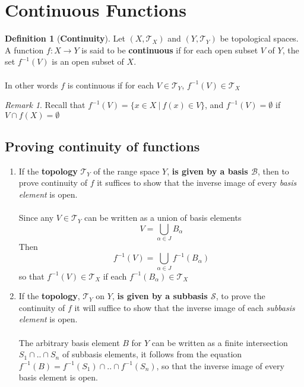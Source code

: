 \documentclass{article}
\theoremstyle{remark}
\newtheorem*{remark}{Remark}
\theoremstyle{definition}
\newtheorem{definition}{Definition}[section]
\begin{document}
\newpage

\section{Continuous Functions}
\medskip
\begin{definition}[\textbf{Continuity}]
Let $(X, \mathcal{T}_X)$ and $(Y, \mathcal{T}_Y)$ be topological spaces. A function $f : X \to Y$ is said to be \textbf{continuous} if for each open subset $V$ of $Y$, the set $f^{-1}(V)$ is an open subset of $X$. \\ \\ In other words $f$ is continuous if for each $V \in \mathcal{T}_Y$, $f^{-1}(V) \in \mathcal{T}_X$
\end{definition}



\begin{remark}
Recall that $f^{-1}(V) = \{ x \in X \ | \  f(x) \in V \}$, and $f^{-1}(V) = \emptyset$ if $V \cap f(X) = \emptyset$
\end{remark}

\bigskip

\subsection{Proving continuity of functions}

\begin{enumerate}
  \item If the \textbf{topology} $\mathcal{T}_Y$ of the range space $Y$, \textbf{is given by a basis $\mathcal{B}$}, then to prove continuity of $f$ it suffices to show that the inverse image of every \textit{basis element} is open. \\ \\
  Since any $V \in \mathcal{T}_Y$ can be written as a union of basis elements $$V = \bigcup_{\alpha \in J}B_{\alpha}$$ Then $$f^{-1}(V) = \bigcup_{\alpha \in J} f^{-1}(B_{\alpha})$$ so that $f^{-1}(V) \in \mathcal{T}_X$ if each $f^{-1}(B_{\alpha}) \in \mathcal{T}_X$
  
  \item If the \textbf{topology}, $\mathcal{T}_Y$ on $Y$, \textbf{is given by a subbasis $\mathcal{S}$}, to prove the continuity of $f$ it will suffice to show that the inverse image of each \textit{subbasis element} is open. \\ \\ The arbitrary basis element $B$ for $Y$ can be written as a finite intersection $S_1 \cap .. \cap S_n$ of subbasis elements, it follows from the equation $f^{-1}(B) = f^{-1}(S_1) \cap .. \cap f^{-1}(S_n)$, so that the inverse image of every basis element is open.
\end{enumerate}
\end{document}
